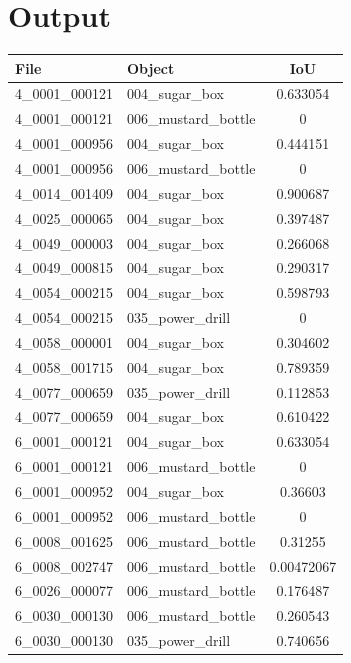 \documentclass[10.5pt,a4paper]{article}
\begin{document}
\section*{Output}
\begin{table}[h]
    \centering
    \small 
    \begin{tabular}{|l|l|c|}
        \hline
        \textbf{File} & \textbf{Object} & \textbf{IoU} \\
        \hline
        4\_0001\_000121 & 004\_sugar\_box & 0.633054 \\
        4\_0001\_000121 & 006\_mustard\_bottle & 0 \\
        4\_0001\_000956 & 004\_sugar\_box & 0.444151 \\
        4\_0001\_000956 & 006\_mustard\_bottle & 0 \\
        4\_0014\_001409 & 004\_sugar\_box & 0.900687 \\
        4\_0025\_000065 & 004\_sugar\_box & 0.397487 \\
        4\_0049\_000003 & 004\_sugar\_box & 0.266068 \\
        4\_0049\_000815 & 004\_sugar\_box & 0.290317 \\
        4\_0054\_000215 & 004\_sugar\_box & 0.598793 \\
        4\_0054\_000215 & 035\_power\_drill & 0 \\
        4\_0058\_000001 & 004\_sugar\_box & 0.304602 \\
        4\_0058\_001715 & 004\_sugar\_box & 0.789359 \\
        4\_0077\_000659 & 035\_power\_drill & 0.112853 \\
        4\_0077\_000659 & 004\_sugar\_box & 0.610422 \\
        6\_0001\_000121 & 004\_sugar\_box & 0.633054 \\
        6\_0001\_000121 & 006\_mustard\_bottle & 0 \\
        6\_0001\_000952 & 004\_sugar\_box & 0.36603 \\
        6\_0001\_000952 & 006\_mustard\_bottle & 0 \\
        6\_0008\_001625 & 006\_mustard\_bottle & 0.31255 \\
        6\_0008\_002747 & 006\_mustard\_bottle & 0.00472067 \\
        6\_0026\_000077 & 006\_mustard\_bottle & 0.176487 \\
        6\_0030\_000130 & 006\_mustard\_bottle & 0.260543 \\
        6\_0030\_000130 & 035\_power\_drill & 0.740656 \\

\end{tabular}
\end{table}
\end{document}
